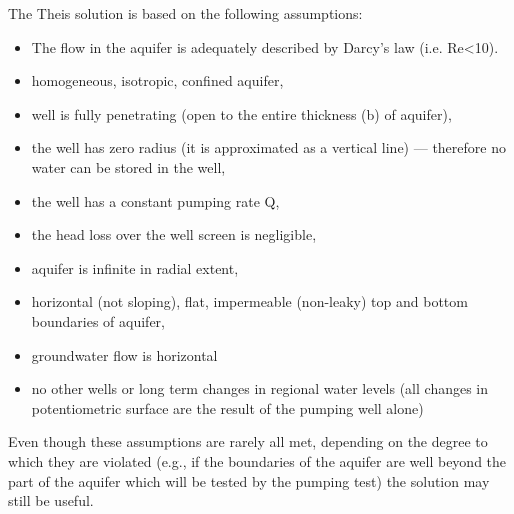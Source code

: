 The Theis solution is based on the following assumptions:

\begin{itemize}
\item The flow in the aquifer is adequately described by Darcy's law (i.e. Re<10).
\end{itemize}
\begin{itemize}
\item homogeneous, isotropic, confined aquifer,
\end{itemize}
\begin{itemize}
\item well is fully penetrating (open to the entire thickness (b) of aquifer),
\end{itemize}
\begin{itemize}
\item the well has zero radius (it is approximated as a vertical line) — therefore no water can be stored in the well,
\end{itemize}
\begin{itemize}
\item the well has a constant pumping rate Q,
\end{itemize}
\begin{itemize}
\item the head loss over the well screen is negligible,
\end{itemize}
\begin{itemize}
\item aquifer is infinite in radial extent,
\end{itemize}
\begin{itemize}
\item horizontal (not sloping), flat, impermeable (non-leaky) top and bottom boundaries of aquifer,
\end{itemize}
\begin{itemize}
\item groundwater flow is horizontal
\end{itemize}
\begin{itemize}
\item no other wells or long term changes in regional water levels (all changes in potentiometric surface are the result of the pumping well alone)
\end{itemize}
\begin{itemize}
\end{itemize}

Even though these assumptions are rarely all met, depending on the degree to which they are violated (e.g., if the boundaries of the aquifer are well beyond the part of the aquifer which will be tested by the pumping test) the solution may still be useful.






